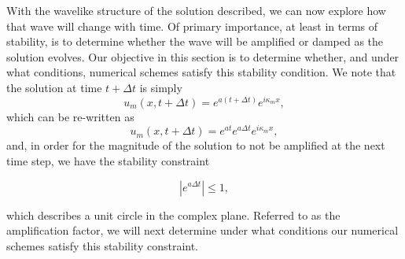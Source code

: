 With the wavelike structure of the solution described, we can now explore how that wave will change with time. Of primary importance, at least in terms of stability, is to determine whether the wave will be amplified or damped as the solution evolves. Our objective in this section is to determine whether, and under what conditions, numerical schemes satisfy this stability condition. We note that the solution at time $t+\Delta t$ is simply
\begin{equation}
	u_m(x,t+\Delta t) = e^{a(t+\Delta t)} e^{i \kappa_m x},
\end{equation}
which can be re-written as
\begin{equation}
	u_m(x,t+\Delta t) = e^{at}e^{a\Delta t} e^{i \kappa_m x},
\end{equation}
and, in order for the magnitude of the solution to not be amplified at the next time step, we have the stability constraint
\begin{eqBox}
\begin{equation}
	|e^{a\Delta t}| \leq 1,
\end{equation}
\end{eqBox}
which describes a unit circle in the complex plane. Referred to as the amplification factor, we will next determine under what conditions our numerical schemes satisfy this stability constraint.

